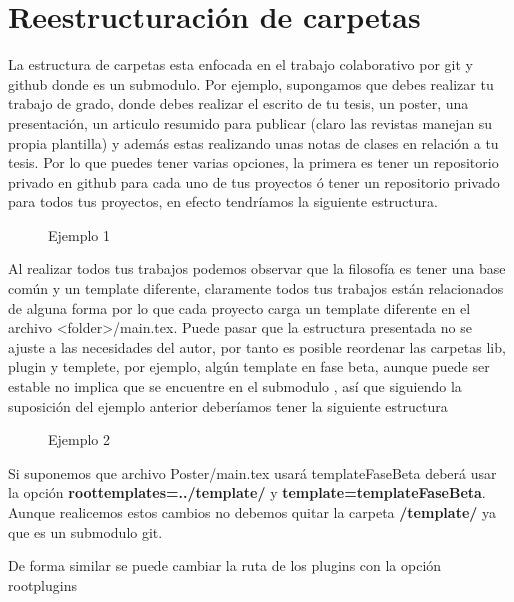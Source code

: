 {	\section{Reestructuración de carpetas}
	La estructura de carpetas esta enfocada en el trabajo colaborativo por git y github donde \printprojectgit\space es un submodulo. Por ejemplo, supongamos que debes realizar tu trabajo de grado, donde debes realizar el escrito de tu tesis, un poster, una presentación, un articulo resumido para publicar (claro las revistas manejan su propia plantilla) y además estas realizando unas notas de clases en relación a tu tesis.\pap
	Por lo que puedes tener varias opciones, la primera es tener un repositorio privado en github para cada uno de tus proyectos ó tener un repositorio privado para todos tus proyectos, en efecto tendríamos la siguiente estructura.
	\begin{figure}[H]
		\caption{Ejemplo 1}
		\label{fig:EstructuraEjemplo1}
	\end{figure}
	Al realizar todos tus trabajos podemos observar que la filosofía \printproject\space es tener una base común y un template diferente, claramente todos tus trabajos están relacionados de alguna forma por lo que cada proyecto carga un template diferente en el archivo <folder>/main.tex.\pap
	Puede pasar que la estructura presentada no se ajuste a las necesidades del autor, por tanto es posible reordenar las carpetas lib, plugin y templete, por ejemplo, algún template en fase beta, aunque puede ser estable no implica que se encuentre en el submodulo \printproject\space, así que siguiendo la suposición del ejemplo anterior deberíamos tener la siguiente estructura
	\begin{figure}[H]
		\caption{Ejemplo 2}
		\label{fig:EstructuraEjemplo2}
	\end{figure}
	Si suponemos que archivo Poster/main.tex usará templateFaseBeta deberá usar la opción \textbf{roottemplates=../template/} y \textbf{template=templateFaseBeta}. Aunque realicemos estos cambios no debemos quitar la carpeta \textbf{\printprojectgit/template/} ya que es un submodulo git.
	\begin{boxbasic}[Nota]
		De forma similar se puede cambiar la ruta de los plugins con la opción rootplugins
	\end{boxbasic}
}
